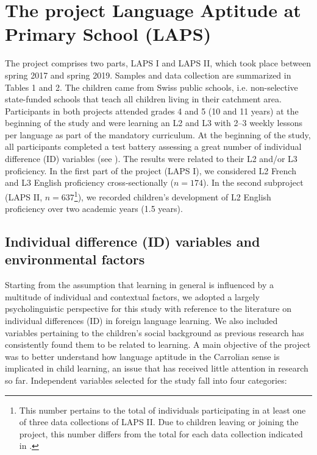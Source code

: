 \documentclass[output=paper]{langsci/langscibook}
\begin{document}
\section{The project Language Aptitude at Primary School (LAPS)}\largerpage

The project comprises two parts, LAPS I and LAPS II, which took place between spring 2017 and spring 2019. Samples and data collection are summarized in Tables 1 and 2. The children came from Swiss public schools, i.e. non-selective state-funded schools that teach all children living in their catchment area. Participants in both projects attended grades 4 and 5 (10 and 11 years) at the beginning of the study and were learning an L2 and L3 with 2--3 weekly lessons per language as part of the mandatory curriculum. At the beginning of the study, all participants completed a test battery assessing a great number of individual difference (ID) variables (see ). The results were related to their L2 and/or L3 proficiency. In the first part of the project (LAPS I), we considered L2 French and L3 English proficiency cross-sectionally ($n=174$). In the second subproject (LAPS II, $n=637$\footnote{This number pertains to the total of individuals participating in at least one of three data collections of LAPS II. Due to children leaving or joining the project, this number differs from the total for each data collection indicated in .}), we recorded children’s development of L2 English proficiency over two academic years (1.5 years).

\subsection{Individual difference (ID) variables and environmental factors}\largerpage

Starting from the assumption that learning in general is influenced by a multitude of individual and contextual factors, we adopted a largely psycholinguistic perspective for this study with reference to the literature on individual differences (ID) in foreign language learning. We also included variables pertaining to the children’s social background as previous research has consistently found them to be related to learning. A main objective of the project was to better understand how language aptitude in the Carrolian sense is implicated in child learning, an issue that has received little attention in research so far. Independent variables selected for the study fall into four categories:
\end{document}
